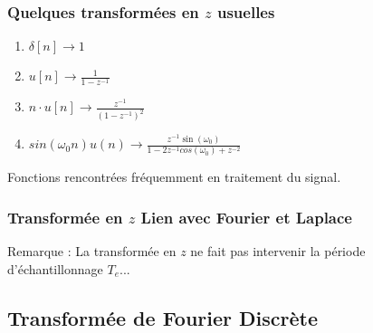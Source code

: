 \documentclass{beamer}
\begin{document}
\begin{frame}
\frametitle{Quelques transformées en $z$ usuelles}

\begin{enumerate}
\item $\delta[n] \rightarrow  1$ 
\item $u[n] \rightarrow \frac{\displaystyle 1}{ \displaystyle 1-z^{-1}}$
\item $n \cdot u[n] \rightarrow \frac{\displaystyle z^{-1}}{\displaystyle (1-z^{-1})^2} $
\item $sin(\omega_0 n)u(n) \rightarrow  \frac{\displaystyle z^{-1} \sin(\omega_0)}{\displaystyle 1-2z^{-1} cos(\omega_0) +z^{-2}} $
\end{enumerate} 
\vspace{0.3cm}

Fonctions rencontrées fréquemment en traitement du signal.

\end{frame}

\begin{frame}
\frametitle{Transformée en $z$ Lien avec Fourier et Laplace}

Remarque : La transformée en $z$ ne fait pas intervenir la période d'échantillonnage $T_e$...\\

\vspace{1cm}

\vspace{1cm}

\end{frame}

\subsection{Transformée de Fourier Discrète}
\end{document}
